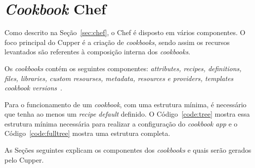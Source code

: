 \section{\textit{Cookbook} Chef}
\label{sec:lev-rec}

Como descrito na Seção~\ref{sec:chef}, o Chef é disposto em vários
componentes. O foco principal do Cupper é a criação de \textit{cookbooks},
sendo assim os recursos levantados são referentes à composição interna
dos \textit{cookbooks}.

Os \textit{cookbooks} contém os seguintes componentes: \textit{attributes, recipes, definitions,
files, libraries, custom resourses, metadata, resources e providers, templates
cookbook versions}~\cite{chefdoc:2016}.

Para o funcionamento de um \textit{cookbook}, com uma estrutura mínima, é necessário que tenha
ao menos um \textit{recipe default} definido. O Código~\ref{code:tree} mostra essa
estrutura mínima necessária para realizar a configuração do \textit{cookbook app} e o Código~\ref{code:fulltree} mostra uma estrutura completa.

\noindent\begin{minipage}{.45\textwidth}
  
\end{minipage}\hfill
\noindent\begin{minipage}{.45\textwidth}
  
\end{minipage}

As Seções seguintes explicam os componentes dos \textit{cookbooks} e quais serão gerados
pelo Cupper.

%

%

%
%
%

%
